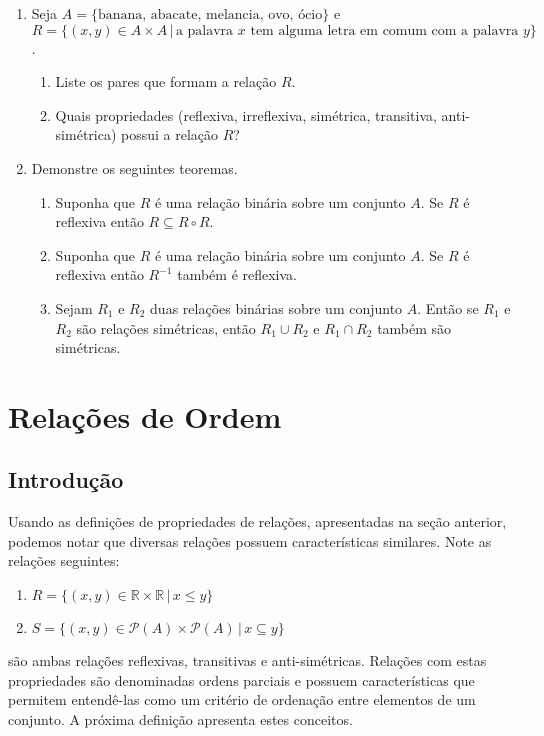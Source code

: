 \begin{enumerate}
  \item Seja $A = \{\text{banana, abacate, melancia, ovo, ócio}\}$ e $R =
    \{(x,y)\in A \times A\,|\, \text{a palavra $x$ tem alguma letra em
    comum com a palavra $y$}\}$.
  \begin{enumerate}
    \item Liste os pares que formam a relação $R$.
    \item Quais propriedades (reflexiva, irreflexiva, simétrica,
      transitiva, anti-simétrica) possui a relação $R$?
  \end{enumerate}
  \item Demonstre os seguintes teoremas.
  \begin{enumerate}
      \item Suponha que $R$ é uma relação binária sobre um conjunto
        $A$. Se $R$ é reflexiva então $R \subseteq R \circ R$.
      \item Suponha que $R$ é uma relação binária sobre um conjunto
        $A$. Se $R$ é reflexiva então $R^{-1}$ também é reflexiva.
      \item Sejam $R_1$ e $R_2$ duas relações binárias sobre um
        conjunto $A$. Então se $R_1$ e $R_2$ são relações simétricas,
        então $R_1\cup R_2$ e $R_1\cap R_2$ também são simétricas.
  \end{enumerate}
\end{enumerate}

\section{Relações de Ordem}

\subsection{Introdução}

Usando as definições de propriedades de relações, apresentadas na seção
anterior, podemos notar que diversas relações possuem características
similares. Note as relações seguintes:

\begin{enumerate}
  \item $R =\{(x,y)\in\mathbb{R}\times\mathbb{R}\,|\,x \leq y\}$
  \item $S = \{(x,y)\in\mathcal{P}(A)\times\mathcal{P}(A)\,|\,x
    \subseteq y\}$
\end{enumerate}
são ambas relações reflexivas, transitivas e anti-simétricas. Relações
com estas propriedades são denominadas ordens parciais e possuem
características que permitem entendê-las como um critério de ordenação
entre elementos de um conjunto. A próxima definição apresenta estes
conceitos.

